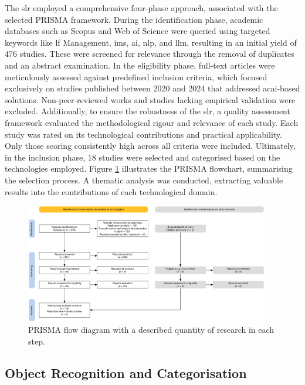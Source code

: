 The \ac{slr} employed a comprehensive four-phase approach, associated with the selected PRISMA framework. During the identification phase, academic databases such as Scopus and Web of Science were queried using targeted keywords like \ac{lf} Management, \ac{ims}, \ac{ai}, \ac{nlp}, and \ac{llm}, resulting in an initial yield of 476 studies. These were screened for relevance through the removal of duplicates and an abstract examination. In the eligibility phase, full-text articles were meticulously assessed against predefined inclusion criteria, which focused exclusively on studies published between 2020 and 2024 that addressed ac{ai}-based solutions. Non-peer-reviewed works and studies lacking empirical validation were excluded. Additionally, to ensure the robustness of the \ac{slr}, a quality assessment framework evaluated the methodological rigour and relevance of each study. Each study was rated on its technological contributions and practical applicability. Only those scoring consistently high across all criteria were included. Ultimately, in the inclusion phase, 18 studies were selected and categorised based on the technologies employed. Figure \ref{fig:prisma} illustrates the PRISMA flowchart, summarising the selection process. A thematic analysis was conducted, extracting valuable results into the contributions of each technological domain.

\begin{figure}[!htb]
    \includegraphics[width=0.95\textwidth]{figs/chapter2/prisma.png}
    \centering
    \caption[PRISMA flow diagram with a described quantity of research in each step.]{PRISMA flow diagram with a described quantity of research in each step.}
    \label{fig:prisma}
\end{figure}

\subsection{Object Recognition and Categorisation} \label{subsec:object-recognition}

